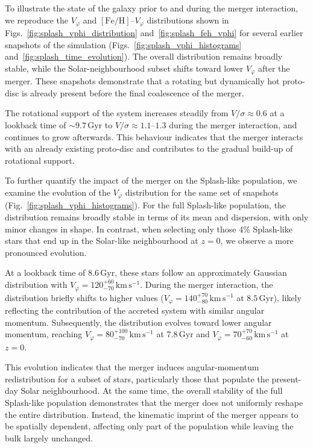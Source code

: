 \documentclass[fleqn,usenatbib]{mnras}
\begin{document}
To illustrate the state of the galaxy prior to and during the merger interaction, we reproduce the $V_\varphi$ and $\mathrm{[Fe/H]}$--$V_\varphi$ distributions shown in Figs.~\ref{fig:splash_vphi_distribution} and~\ref{fig:splash_feh_vphi} for several earlier snapshots of the simulation (Figs.~\ref{fig:splash_vphi_histograms} and~\ref{fig:splash_time_evolution}). The overall distribution remains broadly stable, while the Solar-neighbourhood subset shifts toward lower $V_\varphi$ after the merger. These snapshots demonstrate that a rotating but dynamically hot proto-disc is already present before the final coalescence of the merger.

The rotational support of the system increases steadily from $V/\sigma \approx 0.6$ at a lookback time of $\sim 9.7\,\mathrm{Gyr}$ to $V/\sigma \approx 1.1$--$1.3$ during the merger interaction, and continues to grow afterwards. This behaviour indicates that the merger interacts with an already existing proto-disc and contributes to the gradual build-up of rotational support.

To further quantify the impact of the merger on the Splash-like population, we examine the evolution of the $V_\varphi$ distribution for the same set of snapshots (Fig.~\ref{fig:splash_vphi_histograms}). For the full Splash-like population, the distribution remains broadly stable in terms of its mean and dispersion, with only minor changes in shape. In contrast, when selecting only those 4\% Splash-like stars that end up in the Solar-like neighbourhood at $z=0$, we observe a more pronounced evolution.

At a lookback time of $8.6\,\mathrm{Gyr}$, these stars follow an approximately Gaussian distribution with $V_\varphi = 120_{-70}^{+60}\,\mathrm{km\,s^{-1}}$. During the merger interaction, the distribution briefly shifts to higher values ($V_\varphi = 140_{-80}^{+70}\,\mathrm{km\,s^{-1}}$ at $8.5\,\mathrm{Gyr}$), likely reflecting the contribution of the accreted system with similar angular momentum. Subsequently, the distribution evolves toward lower angular momentum, reaching $V_\varphi = 80_{-70}^{+100}\,\mathrm{km\,s^{-1}}$ at $7.8\,\mathrm{Gyr}$ and $V_\varphi = 70_{-60}^{+70}\,\mathrm{km\,s^{-1}}$ at $z=0$.

This evolution indicates that the merger induces angular-momentum redistribution for a subset of stars, particularly those that populate the present-day Solar neighbourhood. At the same time, the overall stability of the full Splash-like population demonstrates that the merger does not uniformly reshape the entire distribution. Instead, the kinematic imprint of the merger appears to be spatially dependent, affecting only part of the population while leaving the bulk largely unchanged.

\label{lastpage}
\end{document}
